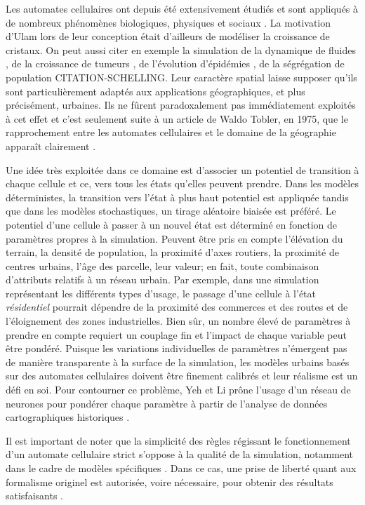 \documentclass[10pt]{article}
\begin{document}
\begin{multicols}{2}
Les automates cellulaires ont depuis été extensivement étudiés et sont
appliqués à de nombreux phénomènes biologiques, physiques et sociaux
\cite{Ganguly}. La motivation d'Ulam lors de leur conception était
d'ailleurs de modéliser la croissance de cristaux. On peut aussi citer
en exemple la simulation de la dynamique de fluides \cite{Frisch1986},
de la croissance de tumeurs \cite{Kansal2000}, de l'évolution
d'épidémies \cite{Fu2003}, de la ségrégation de population
CITATION-SCHELLING. Leur caractère spatial laisse supposer qu'ils sont
particulièrement adaptés aux applications géographiques, et plus
précisément, urbaines. Ils ne fûrent paradoxalement pas immédiatement
exploités à cet effet et c'est seulement suite à un article de Waldo
Tobler, en 1975, que le rapprochement entre les automates cellulaires
et le domaine de la géographie apparaît clairement \cite{Tobler1975}.

Une idée très exploitée dans ce domaine est d'associer un potentiel de
transition à chaque cellule et ce, vers tous les états qu'elles
peuvent prendre. Dans les modèles déterministes, la transition vers
l'état à plus haut potentiel est appliquée tandis que dans les modèles
stochastiques, un tirage aléatoire biaisée est préféré. Le potentiel
d'une cellule à passer à un nouvel état est déterminé en fonction de
paramètres propres à la simulation. Peuvent être pris en compte
l'élévation du terrain, la densité de population, la proximité d'axes
routiers, la proximité de centres urbains, l'âge des parcelle, leur
valeur; en fait, toute combinaison d'attributs relatifs à un réseau
urbain. Par exemple, dans une simulation représentant les différents
types d'usage, le passage d'une cellule à l'état \textit{résidentiel}
pourrait dépendre de la proximité des commerces et des routes et de
l'éloignement des zones industrielles. Bien sûr, un nombre élevé de
paramètres à prendre en compte requiert un couplage fin et l'impact de
chaque variable peut être pondéré. Puisque les variations
individuelles de paramètres n'émergent pas de manière transparente à
la surface de la simulation, les modèles urbains basés sur des
automates cellulaires doivent être finement calibrés et leur réalisme
est un défi en soi. Pour contourner ce problème, Yeh et Li prône
l'usage d'un réseau de neurones pour pondérer chaque paramètre à
partir de l'analyse de données cartographiques historiques
\cite{Yeh2002}.

Il est important de noter que la simplicité des règles régissant le
fonctionnement d'un automate cellulaire strict s'oppose à la qualité
de la simulation, notamment dans le cadre de modèles spécifiques
\cite{Torrens2001}. Dans ce cas, une prise de liberté quant aux
formalisme originel est autorisée, voire nécessaire, pour obtenir des
résultats satisfaisants \cite{White1998}.


\end{multicols}
\end{document}
